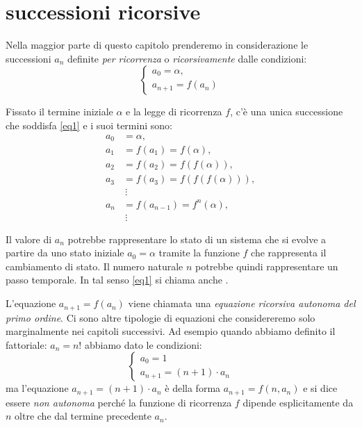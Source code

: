 \chapter{successioni ricorsive}
\label{ch:successioni_ricorsive}

Nella maggior parte di questo capitolo prenderemo in considerazione le successioni $a_n$
definite \emph{per ricorrenza} o \emph{ricorsivamente} dalle condizioni:
\begin{equation}\label{eq1}
\begin{cases}
  a_0 = \alpha,\\
  a_{n+1} = f(a_n)
\end{cases}
\end{equation}

Fissato il termine iniziale $\alpha$ e la legge di ricorrenza $f$,
c'è una unica successione che soddisfa \eqref{eq1} e i suoi termini
sono:
\begin{align*}
a_0 & =\alpha,\\
a_1 &= f(a_1)=f(\alpha),\\
a_2 &= f(a_2)=f(f(\alpha)),\\
a_3 &= f(a_3)=f(f(f(\alpha))),\\
&\ \vdots\\
a_n &= f(a_{n-1}) = f^n(\alpha),\\
&\ \vdots
\end{align*}


Il valore di $a_n$ potrebbe rappresentare lo stato di un sistema che
si evolve a partire da uno stato iniziale $a_0=\alpha$ tramite la
funzione $f$ che rappresenta il cambiamento di stato.
Il numero naturale $n$ potrebbe quindi rappresentare un passo temporale.
In tal senso \eqref{eq1} si chiama anche .

L'equazione $a_{n+1} = f(a_n)$ viene chiamata una \emph{equazione ricorsiva autonoma del primo ordine}.
Ci sono altre tipologie di equazioni che considereremo
solo marginalmente nei capitoli successivi.
Ad esempio quando abbiamo definito
il fattoriale: $a_n = n!$ abbiamo dato le condizioni:
\[
\begin{cases}
  a_0 = 1\\
  a_{n+1} = (n+1) \cdot a_n
\end{cases}
\]
ma l'equazione $a_{n+1} = (n+1) \cdot a_n$ è della forma $a_{n+1} =
f(n, a_n)$ e si dice essere \emph{non autonoma} perché la funzione di
ricorrenza $f$ dipende esplicitamente da $n$ oltre che dal termine
precedente $a_n$.

